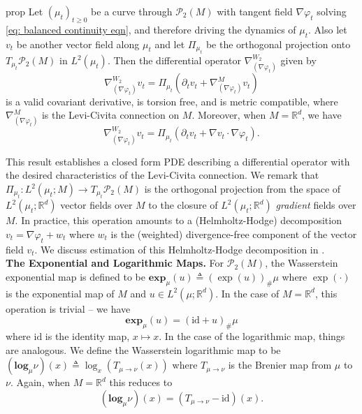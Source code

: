 \documentclass[11pt]{article}
\newcommand{\man}{M}
\begin{document}
\begin{restatable}{prop}{} \label{Wasserstein covariant deriv}
    Let $(\mu_t)_{t\geq 0}$ be a curve through $\mathcal{P}_2(\man)$ with tangent field $\nabla \varphi_t$ solving \cref{eq: balanced continuity eqn}, and therefore driving the dynamics of $\mu_t$. Also let $v_t$ be another vector field along $\mu_t$ and let $\Pi_{\mu_t}$ be the orthogonal projection onto $T_{\mu_t}\mathcal{P}_2(\man)$ in $L^2(\mu_t)$. Then the differential operator $\nabla_{(\nabla\varphi_t)}^{W_2}$ given by
    \begin{equation*}
        \nabla_{(\nabla\varphi_t)}^{W_2}v_t = \Pi_{\mu_t}\left(\partial_t v_t + \nabla^{\man}_{( \nabla \varphi_t)} v_t \right)
    \end{equation*}
    is a valid covariant derivative, is torsion free, and is metric compatible, where $\nabla^{\man}_{( \nabla \varphi_t)}$ is the Levi-Civita connection on $\man$. Moreover, when $\man = \mathbb{R}^d$, we have
    \begin{equation*}
        \nabla_{(\nabla\varphi_t)}^{W_2}v_t = \Pi_{\mu_t}\left(\partial_t v_t + \nabla v_t \cdot \nabla \varphi_t\right).
    \end{equation*}
\end{restatable}
This result establishes a closed form PDE describing a differential operator with the desired characteristics of the Levi-Civita connection. We remark that $\Pi_{\mu_t}: L^2(\mu_t; \man) \rightarrow T_{\mu_t}\mathcal{P}_2(\man)$ is the orthogonal projection from the space of $L^2(\mu_t; \mathbb{R}^d)$ vector fields over $\man$ to the closure of $L^2(\mu_t; \mathbb{R}^d)$ \textit{gradient} fields over $\man$. In practice, this operation amounts to a (Helmholtz-Hodge) decomposition $v_t = \nabla \varphi_t + w_t$ where $w_t$ is the (weighted) divergence-free component of the vector field $v_t$. We discuss estimation of this Helmholtz-Hodge decomposition in .
\\

\noindent \textbf{The Exponential and Logarithmic Maps.} For $\mathcal{P}_{2}(\man)$, the Wasserstein exponential map is defined to be $\mathbf{exp}_{\mu}(u) \triangleq (\exp(u))_\#\mu$ where $\exp(\cdot)$ is the exponential map of $\man$ and $u \in L^2(\mu; \mathbb{R}^d)$. In the case of $\man = \mathbb{R}^d$, this operation is trivial -- we have
\begin{equation}\label{eq: wasserstein euclidean expmap}
    \mathbf{exp}_\mu(u) = (\text{id} + u)_\# \mu
\end{equation}
where $\text{id}$ is the identity map, $x \mapsto x$. In the case of the logarithmic map, things are analogous. We define the Wasserstein logarithmic map to be $(\mathbf{log}_\mu\nu) (x) \triangleq \log_x(T_{\mu \rightarrow \nu}(x))$ where $T_{\mu \rightarrow \nu}$ is the Brenier map from $\mu$ to $\nu$.  Again, when $\man = \mathbb{R}^d$ this reduces to
\begin{equation}\label{eq: wasserstein euclidean logmap}
    (\mathbf{log}_\mu\nu )(x) = (T_{\mu \rightarrow \nu} - \text{id})(x).
\end{equation}
\end{document}

